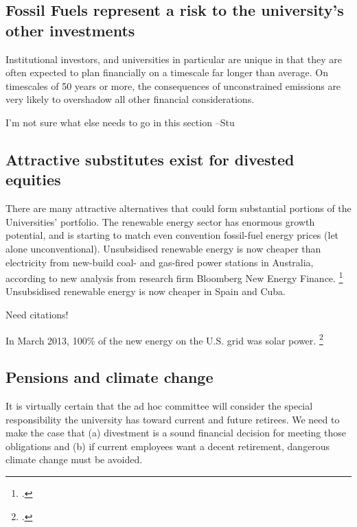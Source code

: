 \subsection {Fossil Fuels represent a risk to the university's other investments}

Institutional investors, and universities in particular are unique in that they are often expected to plan financially on a timescale far longer than average. 
On timescales of 50 years or more, the consequences of unconstrained emissions are very likely to overshadow all other financial considerations.
\begin{vcom}
I'm not sure what else needs to go in this section --Stu
\end{vcom}


\subsection {Attractive substitutes exist for divested equities}

There are many attractive alternatives that could form substantial portions of the Universities' portfolio.
The renewable energy sector has enormous growth potential, and is starting to match even convention fossil-fuel energy prices (let alone unconventional).
Unsubsidised renewable energy is now cheaper than electricity from new-build coal- and gas-fired power stations in Australia, according to new analysis from research firm Bloomberg New Energy Finance. \footcite{BlombergAussieWind}
Unsubsidised renewable energy is now cheaper in Spain and Cuba. \begin{vcom}  Need citations!\end{vcom}
In March 2013, 100\% of the new energy on the U.S. grid was solar power. \footcite{SmartPlanetSolar100}



\subsection {Pensions and climate change}

\begin{vcom}
  It is virtually certain that the ad hoc committee will consider the special responsibility the university has toward current and future retirees. We need to make the case that (a) divestment is a sound financial decision for meeting those obligations and (b) if current employees want a decent retirement, dangerous climate change must be avoided.
\end{vcom}



